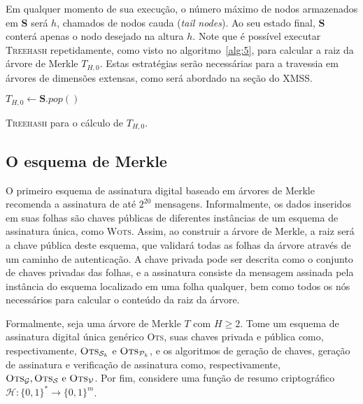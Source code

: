 \documentclass[12pt]{report}
\newcommand{\hh}{\mathcal{H}}
\newcommand{\pk}{\mathcal{P}_k}
\newcommand{\sk}{\mathcal{S}_k}
\newcommand{\binwds}[1]{\{0, 1\}^{#1}}
\newcommand{\fhash}[1]{\hh{} : \binwds{*} \longrightarrow \binwds{#1}}
\begin{document}
Em qualquer momento de sua execução, o número máximo de nodos armazenados em
\textbf{S} será $h$, chamados de nodos cauda (\emph{tail nodes}). Ao seu estado
final, \textbf{S} conterá apenas o nodo desejado na altura $h$.
Note que é possível executar \textsc{Treehash} repetidamente, como visto no
algoritmo~\ref{alg:5}, para calcular a raiz da árvore de Merkle $T_{H,0}$.
Estas estratégias serão necessárias para a travessia em árvores de dimensões
extensas, como será abordado na seção do XMSS.

\begin{algorithm}[ht]
\vspace{2mm}
  $T_{H, 0} \longleftarrow \mathbf{S}.pop()$\;
  \vspace{2mm}
  \caption{\textsc{Treehash} para o cálculo de $T_{H,0}$.}
  \label{alg:5}
\end{algorithm}

\subsection{O esquema de Merkle}

O primeiro esquema de assinatura digital baseado em árvores de Merkle
\cite{Merkle:1989:CDS:118209.118230} recomenda a assinatura de até $2^{20}$
mensagens. Informalmente, os dados inseridos em suas folhas são chaves públicas
de diferentes instâncias de um esquema de assinatura única, como \textsc{Wots}.
Assim, ao construir a árvore de Merkle, a raiz será a chave pública deste
esquema, que validará todas as folhas da árvore através de um caminho de
autenticação. A chave privada pode ser descrita como o conjunto de chaves
privadas das folhas, e a assinatura consiste da mensagem assinada pela
instância do esquema localizado em uma folha qualquer, bem como todos os nós
necessários para calcular o conteúdo da raiz da árvore.

Formalmente, seja uma árvore de Merkle $T$ com $H \geq 2$. Tome um esquema de
assinatura digital única genérico \textsc{Ots}, suas chaves privada e pública
como, respectivamente, $\textsc{Ots}_{\sk{}}$ e $\textsc{Ots}_{\pk{}}$, e os
algoritmos de geração de chaves, geração de assinatura e verificação de
assinatura como, respectivamente, $\textsc{Ots}_\mathcal{G},
\textsc{Ots}_\mathcal{S} \text{ e } \textsc{Ots}_\mathcal{V}$. Por fim,
considere uma função de resumo criptográfico $\fhash{m}$.
\end{document}
